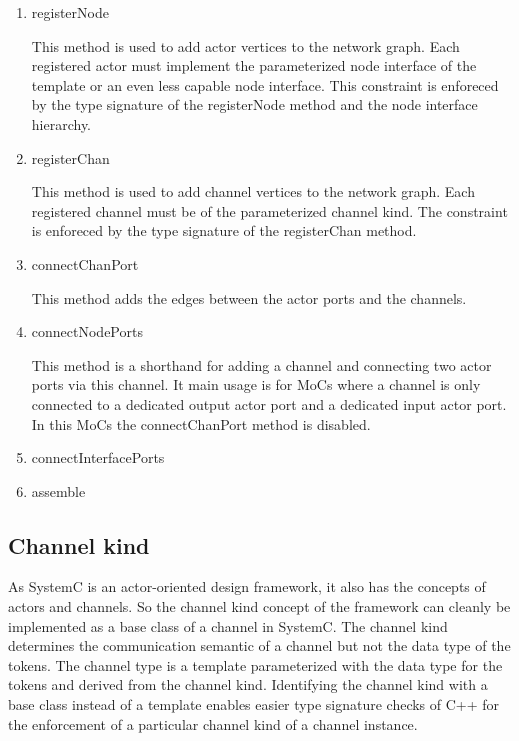 \begin{enumerate}
\item registerNode

This method is used to add actor vertices to the network graph.
Each registered actor must implement
the parameterized node interface of the 
template or an even less capable node interface.
This constraint is enforeced by the type signature
of the registerNode method and the node interface hierarchy.

\item registerChan

This method is used to add channel vertices to the network graph.
Each registered channel must be of the parameterized channel kind.
The constraint is enforeced by the type signature
of the registerChan method.

\item connectChanPort

This method adds the edges between the actor ports and the
channels.

\item connectNodePorts

This method is a shorthand for adding a channel and
connecting two actor ports via this channel. It main usage
is for MoCs where a channel is only connected to a dedicated
output actor port and a dedicated input actor port. In
this MoCs the connectChanPort method is disabled.

\item connectInterfacePorts

\item assemble

\end{enumerate}

\subsection{Channel kind}

As SystemC is an actor-oriented design framework, it also has the concepts of actors
and channels. So the channel kind concept of the \SysteMoC{} framework can cleanly be implemented
as a base class of a channel in SystemC. The channel kind determines the
communication semantic of a channel but not the data type of the tokens.
The channel type is a template parameterized with the data type for the tokens and
derived from the channel kind. Identifying the channel kind with a base class instead
of a template enables easier type signature checks of C++ for the enforcement of a
particular channel kind of a channel instance.

